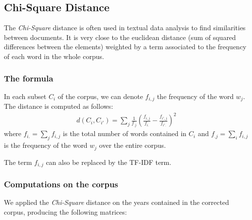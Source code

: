 \subsection{Chi-Square Distance}

The \emph{Chi-Square} distance is often used in textual data analysis to find similarities between documents. It is very close to the euclidean distance (sum of squared differences between the elements) weighted by a term associated to the frequency of each word in the whole corpus.

\subsubsection{The formula}

In each subset $C_i$ of the corpus, we can denote $f_{i,j}$ the frequency of the word $w_j$. The distance is computed as follows:
\begin{eqnarray}
 d(C_i,C_{i'}) = \sum_j \frac{1}{f_{.j}} (\frac{f_{i,j}}{f_{i.}} - \frac{f_{i',j}}{f_{i'.}})^2
\end{eqnarray}
where $f_{i.} = \sum_j f_{i,j}$ is the total number of words contained in $C_i$ and $f_{.j} = \sum_i f_{i,j}$ is the frequency of the word $w_j$ over the entire corpus.

The term $f_{i,j}$ can also be replaced by the TF-IDF term.

\subsubsection{Computations on the corpus}

We applied the \emph{Chi-Square} distance on the years contained in the corrected corpus, producing the following matrices:

